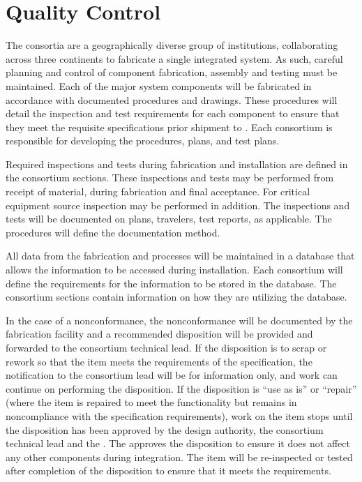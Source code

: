 \section{ Quality Control}
  
The  consortia are a geographically diverse group of institutions,
collaborating across three continents to fabricate a single integrated
system. As such, careful planning and control of component
fabrication, assembly and testing must be maintained. Each of the
major system components will be fabricated in accordance with
documented procedures and drawings.  These procedures will detail the
inspection and test requirements for each component to ensure that they
meet the requisite specifications prior shipment to .
Each consortium is responsible for developing the procedures, 
plans, and test plans.

Required inspections and tests during fabrication and installation are
defined in the consortium  sections. These inspections and tests may
be performed from receipt of material, during fabrication and final
acceptance. For critical equipment source inspection may be performed
in addition. The inspections and tests will be documented on  plans,
travelers, test reports, as applicable.  The procedures will define
the documentation method.

All data from the fabrication and  processes will be maintained in a
database that allows the information to be accessed %
during installation. Each consortium will define the requirements for
the information to be stored in the database. The consortium 
sections contain information on how they are utilizing the database.

In the case of a nonconformance, the nonconformance will be documented
by the fabrication facility and a recommended disposition will be
provided and forwarded to the consortium technical lead.  If the
disposition is to scrap or rework so that the item meets the requirements
of the specification, the notification to the consortium lead will be %
for information only, and work can continue on performing the
disposition.  If the disposition is ``use as is'' or ``repair'' (where the
item is repaired to meet the functionality but remains in
noncompliance with the specification requirements), work on the item
stops until the disposition has been approved by the design
authority, the consortium technical lead and the .  The 
approves the disposition to ensure it does not affect any
other  components during integration. The item will be
re-inspected or tested after completion of the disposition to ensure
that it meets the requirements.

